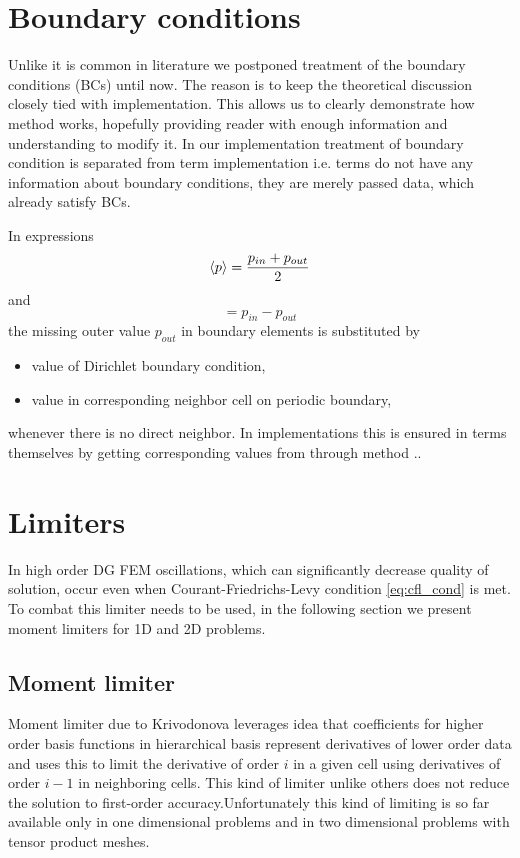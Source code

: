 \section{Boundary conditions}
Unlike it is common in literature we postponed treatment of the boundary 
conditions (BCs) until now. The reason is to keep the theoretical discussion 
closely tied with implementation. This allows us to clearly demonstrate how 
method works, hopefully providing reader with enough information and 
understanding to modify it. In our implementation treatment of boundary 
condition is separated from term implementation i.e. terms do not have any 
information about boundary conditions, they are merely passed data, which 
already satisfy BCs.

In expressions
\begin{equation}
	  \langle p\rangle = \frac{p_{in} + p_{out}}{2}
\end{equation}
and 
\begin{equation}
	[p] = p_{in} - p_{out}
\end{equation}
the missing outer value $p_{out}$ in boundary elements is substituted by
\begin{itemize}
	\item value of Dirichlet boundary condition, 
	\item value in corresponding neighbor cell on periodic boundary,
\end{itemize} 
whenever there is no direct neighbor.
In implementations this is ensured in terms themselves by getting corresponding values 
from  through method ..

\newpage
\section{Limiters}
\label{se:limiters}
In high order DG FEM oscillations, which can significantly decrease quality of 
solution, occur even when Courant-Friedrichs-Levy condition \eqref{eq:cfl_cond} is met. 
To combat this limiter needs to be used, in the following section we present moment 
limiters for 1D and 
2D problems.

\subsection{Moment limiter}
Moment limiter due to Krivodonova \cite{Krivodonova2007} leverages idea that 
coefficients for higher order basis functions in hierarchical basis represent 
derivatives of lower order data and uses this to limit the derivative of 
order $i$ in a given cell using derivatives of order $i - 1$ in neighboring 
cells. This kind of limiter unlike others does not reduce the solution to 
first-order accuracy.Unfortunately this kind of limiting is so far available 
only in one dimensional problems and in two dimensional problems with tensor 
product meshes.

